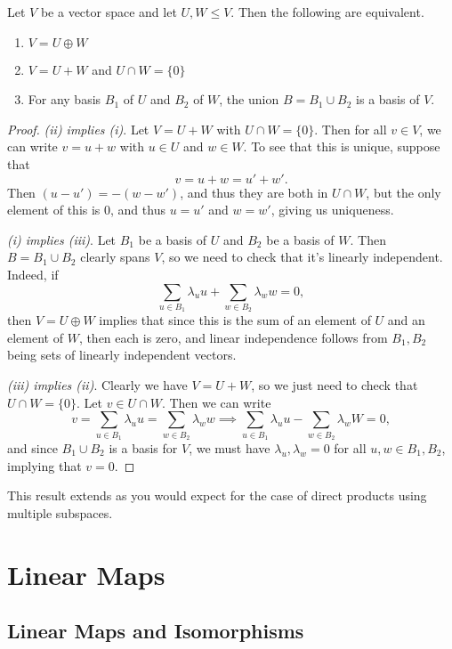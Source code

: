 \documentclass[a4paper]{scrartcl}
\begin{document}
\begin{lemma}
    Let $V$ be a vector space and let $U, W \leq V$.
    Then the following are equivalent.
    \begin{enumerate}[label=(\roman*)]
        \item $V = U \oplus W$
        \item $V = U + W$ and $U \cap W = \{0\}$
        \item For any basis $B_1$ of $U$ and $B_2$ of $W$, the union $B = B_1 \cup B_2$ is a basis of $V$.
    \end{enumerate}
\end{lemma}
\begin{proof}
    \emph{(ii) implies (i)}. Let $V = U + W$ with $U \cap W = \{0\}$. Then for all $v \in V$, we can write $v = u + w$ with $u \in U$ and $w \in W$. To see that this is unique, suppose that
    $$
    v = u + w = u' + w'.
    $$
    Then $(u - u') = - (w-w')$, and thus they are both in $U \cap W$, but the only element of this is $0$, and thus $u = u'$ and $w = w'$, giving us uniqueness.

    \emph{(i) implies (iii)}. Let $B_1$ be a basis of $U$ and $B_2$ be a basis of $W$. Then $B = B_1 \cup B_2$ clearly spans $V$, so we need to check that it's linearly independent. Indeed, if
    $$
    \sum_{u \in B_1} \lambda_u u + \sum_{w \in B_2} \lambda_w w = 0,
    $$
    then $V = U \oplus W$ implies that since this is the sum of an element of $U$ and an element of $W$, then each is zero, and linear independence follows from $B_1, B_2$ being sets of linearly independent vectors.

    \emph{(iii) implies (ii)}. 
    Clearly we have $V = U+W$, so we just need to check that $U \cap W = \{0\}$. Let $v \in U \cap W$. Then we can write
    $$
    v = \sum_{u \in B_1} \lambda_u u = \sum_{w \in B_2} \lambda_w w \implies \sum_{u \in B_1} \lambda_u u - \sum_{w \in B_2} \lambda_w W = 0,
    $$
    and since $B_1 \cup B_2$ is a basis for $V$, we must have $\lambda_u, \lambda_w = 0$ for all $u, w \in B_1, B_2$, implying that $v = 0$.
\end{proof}

This result extends as you would expect for the case of direct products using multiple subspaces.

\section{Linear Maps}

\subsection{Linear Maps and Isomorphisms}
\end{document}
